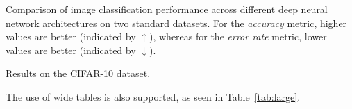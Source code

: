 \documentclass[9pt]{style/friteza}
\begin{document}
\begin{table}[htbp]
    \centering
    \caption{Comparison of image classification performance across different deep neural network architectures on two standard datasets. For the \textit{accuracy} metric, higher values are better (indicated by $\uparrow$), whereas for the \textit{error rate} metric, lower values are better (indicated by $\downarrow$).}
    \label{tab:rezultati_cv}
    \begin{subtable}[b]{0.48\textwidth}
        \centering
        \caption{Results on the CIFAR-10 dataset.}
        \label{tab:cifar10}
    \end{subtable}
    \hfill
    \begin{subtable}[b]{0.48\textwidth}
        \centering
        \caption{Results on the ImageNet dataset.}
        \label{tab:imagenet}
    \end{subtable}
\end{table}

The use of wide tables is also supported, as seen in Table~\ref{tab:large}.
\end{document}
